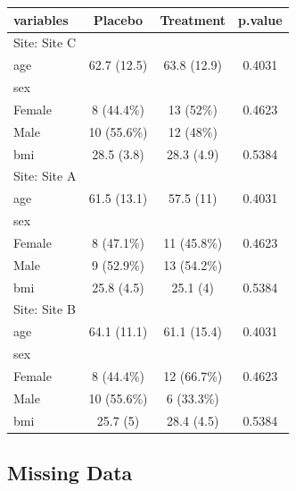 \documentclass[
]{article}
\begin{document}
\begin{tabular}{lccc}
\toprule

\textbf{variables} & \textbf{Placebo} & \textbf{Treatment} & \textbf{p.value} \\
\midrule
Site: Site C &  &  &  \\
\hspace{1em}age & 62.7 (12.5) & 63.8 (12.9) & 0.4031 \\
\hspace{1em}sex &  &  &  \\
\hspace{1em}Female & 8 (44.4\%) & 13 (52\%) & 0.4623 \\
\hspace{1em}Male & 10 (55.6\%) & 12 (48\%) &  \\
\hspace{1em}bmi & 28.5 (3.8) & 28.3 (4.9) & 0.5384 \\
Site: Site A &  &  &  \\
\hspace{1em}age & 61.5 (13.1) & 57.5 (11) & 0.4031 \\
\hspace{1em}sex &  &  &  \\
\hspace{1em}Female & 8 (47.1\%) & 11 (45.8\%) & 0.4623 \\
\hspace{1em}Male & 9 (52.9\%) & 13 (54.2\%) &  \\
\hspace{1em}bmi & 25.8 (4.5) & 25.1 (4) & 0.5384 \\
Site: Site B &  &  &  \\
\hspace{1em}age & 64.1 (11.1) & 61.1 (15.4) & 0.4031 \\
\hspace{1em}sex &  &  &  \\
\hspace{1em}Female & 8 (44.4\%) & 12 (66.7\%) & 0.4623 \\
\hspace{1em}Male & 10 (55.6\%) & 6 (33.3\%) &  \\
\hspace{1em}bmi & 25.7 (5) & 28.4 (4.5) & 0.5384 \\
\bottomrule
\end{tabular}

\subsection{Missing Data}\label{missing-data}
\end{document}
